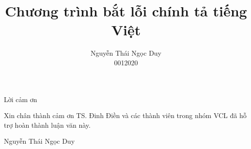 \documentclass[a4paper,oneside,14pt]{extbook} %
\title{Chương trình bắt lỗi chính tả tiếng Việt}
\author{Nguyễn Thái Ngọc Duy\\0012020}
\begin{document}
\dominitoc
\maketitle

\begin{titlepage}
  \begin{center}
    \Large Lời cảm ơn
  \end{center}
  Xin chân thành cảm ơn TS. Đinh Điền và các thành viên trong nhóm VCL
  đã hỗ trợ hoàn thành luận văn này.
\begin{flushright}
  Nguyễn Thái Ngọc Duy
\end{flushright}
\end{titlepage}

\tableofcontents























\end{document}
